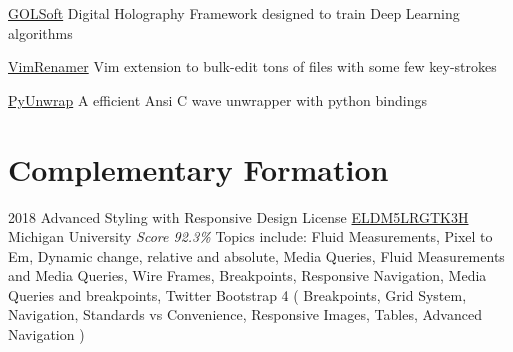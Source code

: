 \documentclass[11pt,a4paper]{moderncv}
\begin{document}

    \cventry{}                                                                          %
        {\href{https://github.com/pointtonull/golsoft}{GOLSoft}}                        %
        {Digital Holography Framework designed                                          %
         to train Deep Learning algorithms}                                             %
        {}{}{}                                                                          %

    \cventry{}                                                                          %
        {\href{https://github.com/pointtonull/vimrenamer}{VimRenamer}}                  %
        {Vim extension to bulk-edit tons of files with some few key-strokes}            %
        {}{}{}                                                                          %

    \cventry{}                                                                          %
        {\href{https://github.com/pointtonull/pyunwrap}{PyUnwrap}}                      %
        {A efficient Ansi C wave unwrapper with python bindings}                        %
        {}{}{}                                                                          %

\section{Complementary Formation}

\cventry
    {2018}
    {Advanced Styling with Responsive Design}
    {License
        \href{https://www.coursera.org/account/accomplishments/records/ELDM5LRGTK3H}
        {ELDM5LRGTK3H}
    }
    {Michigan University}
    {\textit{Score 92.3\%}}
    {
        Topics include:
            Fluid Measurements,
            Pixel to Em,
            Dynamic change,
            relative and absolute,
            Media Queries,
            Fluid Measurements and Media Queries,
            Wire Frames,
            Breakpoints,
            Responsive Navigation,
            Media Queries and breakpoints,
            Twitter Bootstrap 4 (
                Breakpoints,
                Grid System,
                Navigation,
                Standards vs Convenience,
                Responsive Images,
                Tables,
                Advanced Navigation
                )
    }
\end{document}
